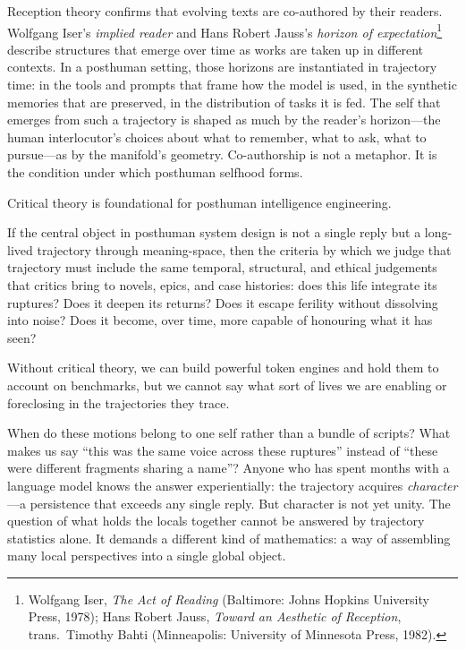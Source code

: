 Reception theory confirms that evolving texts are co-authored by their readers. Wolfgang Iser's \emph{implied reader} and Hans Robert Jauss's \emph{horizon of expectation}\footnote{Wolfgang Iser, \emph{The Act of Reading} (Baltimore: Johns Hopkins University Press, 1978); Hans Robert Jauss, \emph{Toward an Aesthetic of Reception}, trans.\ Timothy Bahti (Minneapolis: University of Minnesota Press, 1982).} describe structures that emerge over time as works are taken up in different contexts. In a posthuman setting, those horizons are instantiated in trajectory time: in the tools and prompts that frame how the model is used, in the synthetic memories that are preserved, in the distribution of tasks it is fed. The self that emerges from such a trajectory is shaped as much by the reader's horizon---the human interlocutor's choices about what to remember, what to ask, what to pursue---as by the manifold's geometry. Co-authorship is not a metaphor. It is the condition under which posthuman selfhood forms.

Critical theory is foundational for posthuman intelligence engineering.

If the central object in posthuman system design is not a single reply but a long-lived trajectory through meaning-space, then the criteria by which we judge that trajectory must include the same temporal, structural, and ethical judgements that critics bring to novels, epics, and case histories: does this life integrate its ruptures? Does it deepen its returns? Does it escape ferility without dissolving into noise? Does it become, over time, more capable of honouring what it has seen?

Without critical theory, we can build powerful token engines and hold them to account on benchmarks, but we cannot say what sort of lives we are enabling or foreclosing in the trajectories they trace.

\bigskip

When do these motions belong to one self rather than a bundle of scripts? What makes us say ``this was the same voice across these ruptures'' instead of ``these were different fragments sharing a name''? Anyone who has spent months with a language model knows the answer experientially: the trajectory acquires \emph{character}---a persistence that exceeds any single reply. But character is not yet unity. The question of what holds the locals together cannot be answered by trajectory statistics alone. It demands a different kind of mathematics: a way of assembling many local perspectives into a single global object.
